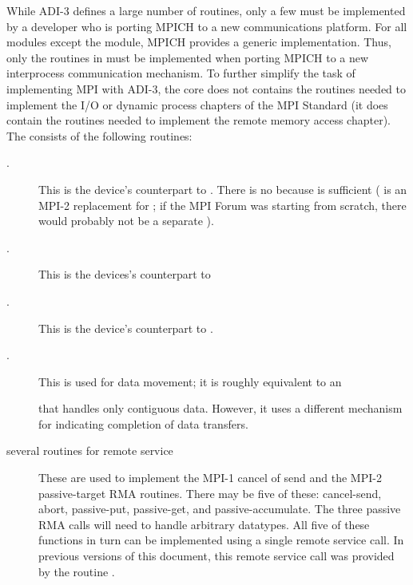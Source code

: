 \documentclass{article}
\begin{document}
While ADI-3 defines a large number of routines, only a few must be implemented
by a developer who is porting MPICH to a new communications platform.
For all modules except the  module, MPICH 
provides a generic implementation.  Thus, only the routines in
 must be implemented when porting MPICH to a new interprocess
communication mechanism.  To further simplify the task of implementing MPI
with ADI-3, the core does not contains the routines needed to implement the
I/O or dynamic process chapters of the MPI Standard (it does contain the
routines needed to implement the remote memory access chapter).  The
 consists of the following routines:  

\begin{description}
\item[.] This is the device's counterpart to
.  There is no  because
 is sufficient ( is an MPI-2
replacement for ; if the MPI Forum was starting from
scratch, there would probably not be a separate ).

\item[.] This is the devices's counterpart to

\item[.] This is the device's counterpart to .

\item[.] This is used for data movement; it is
roughly equivalent to an

 that handles only contiguous data.  However, it uses a
different mechanism for indicating completion of data transfers.

\item[several routines for remote service]These are used to implement
the MPI-1 cancel of send and the MPI-2 passive-target RMA routines.
There may be five of these: cancel-send, abort, passive-put,
passive-get, and passive-accumulate.  The three passive RMA calls will
need to handle arbitrary datatypes.  All five of these functions in
turn can be implemented using a single remote service call.  In
previous versions of this document, this remote service call was
provided by the routine .



\end{description}
\end{document}
